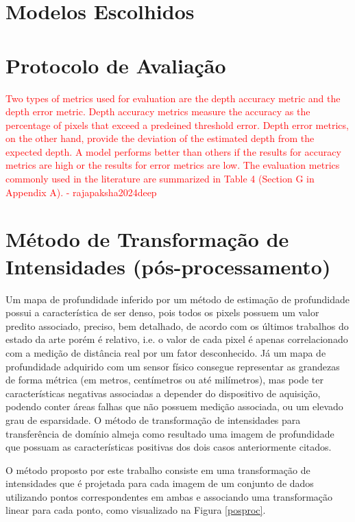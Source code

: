 \section{Modelos Escolhidos}

\section{Protocolo de Avaliação}


\textcolor{red}{Two types of metrics used for evaluation are the depth accuracy metric and the depth error metric. Depth accuracy
metrics measure the accuracy as the percentage of pixels that exceed a predeined threshold error. Depth error
metrics, on the other hand, provide the deviation of the estimated depth from the expected depth. A model
performs better than others if the results for accuracy metrics are high or the results for error metrics are low.
The evaluation metrics commonly used in the literature are summarized in Table 4 (Section G in Appendix A). - rajapaksha2024deep}


\section{Método de Transformação de Intensidades (pós-processamento)}

Um mapa de profundidade inferido por um método de estimação de profundidade possui a característica de ser denso, pois todos os pixels possuem um valor predito associado, preciso, bem detalhado, de acordo com os últimos trabalhos do estado da arte porém é relativo, i.e. o valor de cada pixel é apenas correlacionado com a medição de distância real por um fator desconhecido. Já um mapa de profundidade adquirido com um sensor físico consegue representar as grandezas de forma métrica (em metros, centímetros ou até milímetros), mas pode ter características negativas associadas a depender do dispositivo de aquisição, podendo conter áreas falhas que não possuem medição associada, ou um elevado grau de esparsidade. O método de transformação de intensidades para transferência de domínio almeja como resultado uma imagem de profundidade que possuam as características positivas dos dois casos anteriormente citados. 

O método proposto por este trabalho consiste em uma transformação de intensidades que é projetada para cada imagem de um conjunto de dados utilizando pontos correspondentes em ambas e associando uma transformação linear para cada ponto, como visualizado na Figura \ref{posproc}. 


